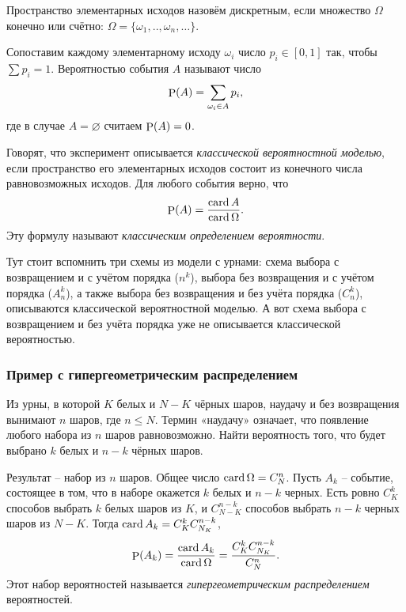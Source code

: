 Пространство элементарных исходов назовём дискретным, если множество $\Omega$ конечно или счётно: $\Omega = \{\omega_1, .., \omega_n, \ldots\}$. 

\begin{to_def}
    Сопоставим каждому элементарному исходу $\omega_i$ число $p_i \in [0, 1]$ так, чтобы $\sum p_i = 1$. Вероятностью события $A$ называют число
    \begin{equation*}
        \P(A) = \sum_{\omega_i \in A} p_i,
    \end{equation*}
    где в случае $A = \varnothing$ считаем $\P(A) = 0$. 
\end{to_def}


\begin{to_def}
    Говорят, что эксперимент описывается \textit{классической вероятностной моделью}, если пространство его элементарных исходов состоит из конечного числа равновозможных исходов. Для любого события верно, что
    \begin{equation}
        \P (A) = \frac{\card A}{\card \Omega}.
    \end{equation}
    Эту формулу называют \textit{классическим определением вероятности}.
\end{to_def}

Тут стоит вспомнить три схемы из модели с урнами: 
схема выбора с возвращением и с учётом порядка ($n^k$), 
выбора без возвращения и с учётом порядка ($A_n^k$), а также выбора
без возвращения и без учёта порядка ($C_n^k$), 
описываются классической вероятностной моделью. 
А вот схема выбора с возвращением и без учёта порядка уже не описывается классической вероятностью. 


\subsubsection*{Пример с гипергеометрическим распределением}
 Из урны, в которой $K$ белых и $N - K$ чёрных шаров, наудачу и без возвращения вынимают $n$ шаров, где $n \leq N$.
Термин «наудачу» означает, что появление любого набора из $n$ шаров равновозможно. Найти вероятность того, что будет выбрано $k$ белых и $n - k$ чёрных шаров.

Результат -- набор из $n$ шаров. Общее число $\card \Omega = C_N^n$. Пусть $A_k$ -- событие, состоящее в том, что в наборе окажется $k$ белых и $n-k$ черных. Есть ровно $C_K^k$ способов выбрать $k$ белых шаров из $K$, и 
$C_{N-K}^{n-k}$ способов выбрать $n-k$ черных шаров из $N-K$. Тогда $\card A_k = C_K^k C_{N_K}^{n-k}$,
\begin{equation*}
    \P (A_k) = \frac{\card A_k}{\card \Omega} = \frac{C_K^k C_{N_K}^{n-k}}{C_N^n}.
\end{equation*}
Этот набор вероятностей называется \textit{гипергеометрическим распределением} вероятностей. 



